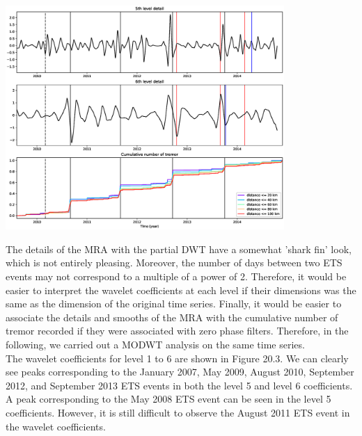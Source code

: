 \documentclass[main.tex]{subfiles}
\begin{document}
\begin{center}
\includegraphics[width=300pt, trim={3.5cm 2.5cm 3.5cm 3cm}, clip]{Figures/slowslip_results/Figure_2.eps}
\captionsetup{type=figure}
\end{center}

The details of the MRA with the partial DWT have a somewhat 'shark fin' look, which is not entirely pleasing. Moreover, the number of days between two ETS events may not correspond to a multiple of a power of 2. Therefore, it would be easier to interpret the wavelet coefficients at each level if their dimensions was the same as the dimension of the original time series. Finally, it would be easier to associate the details and smooths of the MRA with the cumulative number of tremor recorded if they were associated with zero phase filters. Therefore, in the following, we carried out a MODWT analysis on the same time series. \\

The wavelet coefficients for level 1 to 6 are shown in Figure 20.3. We can clearly see peaks corresponding to the January 2007, May 2009, August 2010, September 2012, and September 2013 ETS events in both the level 5 and level 6 coefficients. A peak corresponding to the May 2008 ETS event can be seen in the level 5 coefficients. However, it is still difficult to observe the August 2011 ETS event in the wavelet coefficients. \\
\end{document}
